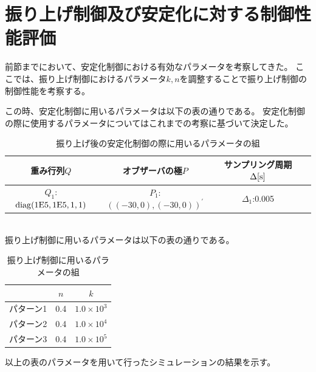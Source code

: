 \section{振り上げ制御及び安定化に対する制御性能評価}
	前節までにおいて、安定化制御における有効なパラメータを考察してきた。
	ここでは、振り上げ制御におけるパラメータ$k,n$を調整することで振り上げ制御の制御性能を考察する。
	\par
	この時、安定化制御に用いるパラメータは以下の表の通りである。
	安定化制御の際に使用するパラメータについてはこれまでの考察に基づいて決定した。
	\begin{table}[htb]
		\begin{center}
			\caption{振り上げ後の安定化制御の際に用いるパラメータの組}
			\medskip
			
			\begin{tabular}{|c|c|c|c|}\hline
				重み行列$Q$ & オブザーバの極$P$ & サンプリング周期$\Delta[\rm{s}]$ \\ \hline\hline
				$Q_1$:$\rm{diag}(1E5,1E5,1,1)$ & $P_1$:$((-30,0),(-30,0))^{'}$ & $\Delta_1$:0.005 \\ \hline
			\end{tabular}
		\end{center}
		\label{table:huriage_control}
	\end{table}
	\\
	振り上げ制御に用いるパラメータは以下の表の通りである。
	\begin{table}[htb]
		\begin{center}
			\caption{振り上げ制御に用いるパラメータの組}
			\medskip
			
			\begin{tabular}{|c|c|c|}\hline
				& $n$ & $k$ \\ \hline\hline
				パターン1 & 0.4 & $1.0×10^3$  \\ \hline
				パターン2 & 0.4 & $1.0×10^4$  \\ \hline
				パターン3 & 0.4 & $1.0×10^5$  \\ \hline
			\end{tabular}
		\end{center}
		\label{table:huriage_huriage}
	\end{table}
	以上の表のパラメータを用いて行ったシミュレーションの結果を示す。
	
	
	
	
	
	
